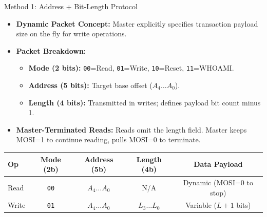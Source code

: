\documentclass{beamer}
\begin{document}
\begin{frame}{Method 1: Address + Bit-Length Protocol}
  \begin{itemize}
    \item \textbf{Dynamic Packet Concept:} Master explicitly specifies transaction payload size on the fly for write operations.
    \item \textbf{Packet Breakdown:}
    \begin{itemize}
      \item \textbf{Mode (2 bits):} \texttt{00}=Read, \texttt{01}=Write, \texttt{10}=Reset, \texttt{11}=WHOAMI.
      \item \textbf{Address (5 bits):} Target base offset ($A_4 \dots A_0$).
      \item \textbf{Length (4 bits):} Transmitted in writes; defines payload bit count minus 1.
    \end{itemize}
    \item \textbf{Master-Terminated Reads:} Reads omit the length field. Master keeps MOSI=1 to continue reading, pulls MOSI=0 to terminate.
  \end{itemize}
  \begin{table}
    \centering\tiny
    \begin{tabular}{lcccc}
      \toprule
      \textbf{Op} & \textbf{Mode (2b)} & \textbf{Address (5b)} & \textbf{Length (4b)} & \textbf{Data Payload} \\
      \midrule
      Read & \texttt{00} & $A_4 \dots A_0$ & N/A & Dynamic (MOSI=0 to stop) \\
      Write & \texttt{01} & $A_4 \dots A_0$ & $L_3 \dots L_0$ & Variable ($L+1$ bits) \\
      \bottomrule
    \end{tabular}
  \end{table}
\end{frame}
\end{document}
